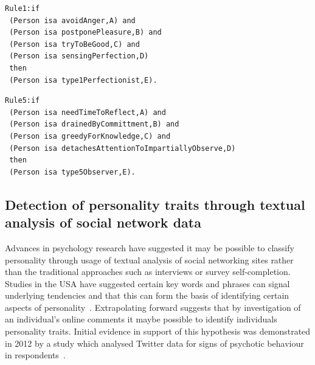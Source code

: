 \documentclass{llncs}
\begin{document}
\noindent\begin{minipage}{.48\textwidth}
\begin{lstlisting}[caption=Rule for Type 1 Perfectionist,frame=none,basicstyle=\ttfamily\scriptsize,label=lst:rule1]
Rule1:if
 (Person isa avoidAnger,A) and
 (Person isa postponePleasure,B) and
 (Person isa tryToBeGood,C) and
 (Person isa sensingPerfection,D)
 then
 (Person isa type1Perfectionist,E).
\end{lstlisting}
\end{minipage}\hfill
\begin{minipage}{.48\textwidth}
\begin{lstlisting}[caption=Rule for Type 5 Observer,frame=none,basicstyle=\ttfamily\scriptsize,label=lst:rule2]
Rule5:if
 (Person isa needTimeToReflect,A) and
 (Person isa drainedByCommittment,B) and
 (Person isa greedyForKnowledge,C) and
 (Person isa detachesAttentionToImpartiallyObserve,D)
 then
 (Person isa type5Observer,E).
\end{lstlisting}
\end{minipage}



\subsection{Detection of personality traits through textual analysis
  of social network data}\label{detection}

Advances in psychology research have suggested it may be
possible to classify personality through usage of textual analysis of
social networking sites rather than the traditional approaches such as
interviews or survey self-completion. Studies in the USA have
suggested certain key words and phrases can signal underlying
tendencies and that this can form the basis of identifying certain
aspects of personality~\cite{woodworth-et-al:2012}. Extrapolating
forward suggests that by investigation of an individual's online
comments it maybe possible to identify individuals personality
traits. Initial evidence in support of this hypothesis was
demonstrated in 2012 by a study which analysed Twitter data for
signs of psychotic behaviour in respondents~\cite{sumner-et-al:2012}.
\end{document}
